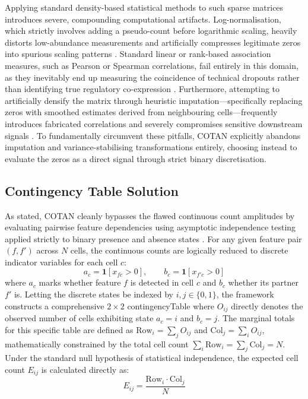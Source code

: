 Applying standard density-based statistical methods to such sparse matrices introduces severe, compounding computational artifacts. Log-normalisation, which strictly involves adding a pseudo-count before logarithmic scaling, heavily distorts low-abundance measurements and artificially compresses legitimate zeros into spurious scaling patterns \cite{galfre2021cotan}. Standard linear or rank-based association measures, such as Pearson or Spearman correlations, fail entirely in this domain, as they inevitably end up measuring the coincidence of technical dropouts rather than identifying true regulatory co-expression \cite{galfre2021cotan}. Furthermore, attempting to artificially densify the matrix through heuristic imputation---specifically replacing zeros with smoothed estimates derived from neighbouring cells---frequently introduces fabricated correlations and severely compromises sensitive downstream signals \cite{galfre2021cotan}. To fundamentally circumvent these pitfalls, COTAN explicitly abandons imputation and variance-stabilising transformations entirely, choosing instead to evaluate the zeros as a direct signal through strict binary discretisation.

\subsection{Contingency Table Solution}

As stated, COTAN cleanly bypasses the flawed continuous count amplitudes by evaluating pairwise feature dependencies using asymptotic independence testing applied strictly to binary presence and absence states \cite{galfre2021cotan}. For any given feature pair $(f, f')$ across $N$ cells, the continuous counts are logically reduced to discrete indicator variables for each cell $c$:
$$ a_c = \mathbf{1}[x_{fc} > 0], \qquad b_c = \mathbf{1}[x_{f'c} > 0] $$
where $a_c$ marks whether feature $f$ is detected in cell $c$ and $b_c$ whether its partner $f'$ is. Letting the discrete states be indexed by $i, j \in \{0,1\}$, the framework constructs a comprehensive $2 \times 2$ \gls{contingencyTable} where $O_{ij}$ directly denotes the observed number of cells exhibiting state $a_c = i$ and $b_c = j$. The marginal totals for this specific table are defined as $\mathrm{Row}_i = \sum_j O_{ij}$ and $\mathrm{Col}_j = \sum_i O_{ij}$, mathematically constrained by the total cell count $\sum_i \mathrm{Row}_i = \sum_j \mathrm{Col}_j = N$. Under the standard null hypothesis of statistical independence, the expected cell count $E_{ij}$ is calculated directly as:
$$ E_{ij} = \frac{\mathrm{Row}_i \cdot \mathrm{Col}_j}{N} $$

